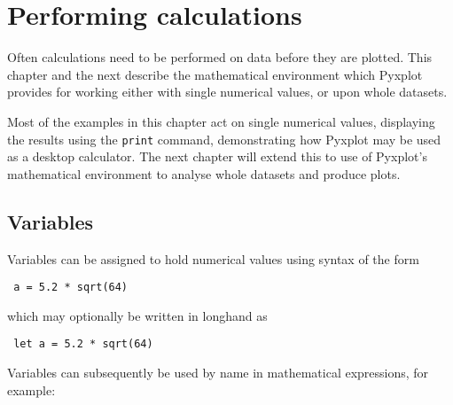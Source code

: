 %
%
%
%
%



\chapter{Performing calculations}

Often calculations need to be performed on data before they are plotted. This
chapter and the next describe the mathematical environment which Pyxplot
provides for working either with single numerical values, or upon whole
datasets.

Most of the examples in this chapter act on single numerical values, displaying
the results using the {\tt print} command, demonstrating how Pyxplot may be
used as a desktop calculator. The next chapter will extend this to use of
Pyxplot's mathematical environment to analyse whole datasets and produce plots.

\section{Variables}

Variables can be assigned to hold numerical values using syntax of the form

\begin{verbatim} a = 5.2 * sqrt(64) \end{verbatim}

\noindent which may optionally be written in longhand as

\begin{verbatim} let a = 5.2 * sqrt(64) \end{verbatim}

\noindent Variables can subsequently be used by name in mathematical
expressions, for example:

